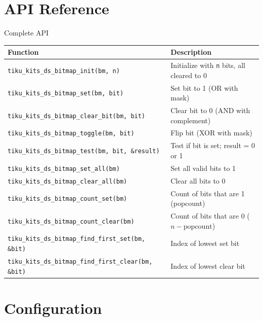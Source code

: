 \documentclass[aspectratio=169, 10pt]{beamer}
\begin{document}
\section{API Reference}

\begin{frame}[fragile]{Complete API}
\begin{table}
\centering
\small
\begin{tabular}{@{}lp{7.5cm}@{}}
\toprule
\textbf{Function} & \textbf{Description} \\
\midrule
\texttt{tiku\_kits\_ds\_bitmap\_init(bm, n)}
  & Initialize with \texttt{n} bits, all cleared to 0 \\
\midrule
\texttt{tiku\_kits\_ds\_bitmap\_set(bm, bit)}
  & Set bit to 1 (OR with mask) \\
\texttt{tiku\_kits\_ds\_bitmap\_clear\_bit(bm, bit)}
  & Clear bit to 0 (AND with complement) \\
\texttt{tiku\_kits\_ds\_bitmap\_toggle(bm, bit)}
  & Flip bit (XOR with mask) \\
\texttt{tiku\_kits\_ds\_bitmap\_test(bm, bit, \&result)}
  & Test if bit is set; result = 0 or 1 \\
\midrule
\texttt{tiku\_kits\_ds\_bitmap\_set\_all(bm)}
  & Set all valid bits to 1 \\
\texttt{tiku\_kits\_ds\_bitmap\_clear\_all(bm)}
  & Clear all bits to 0 \\
\midrule
\texttt{tiku\_kits\_ds\_bitmap\_count\_set(bm)}
  & Count of bits that are 1 (popcount) \\
\texttt{tiku\_kits\_ds\_bitmap\_count\_clear(bm)}
  & Count of bits that are 0 ($n - \text{popcount}$) \\
\midrule
\texttt{tiku\_kits\_ds\_bitmap\_find\_first\_set(bm, \&bit)}
  & Index of lowest set bit \\
\texttt{tiku\_kits\_ds\_bitmap\_find\_first\_clear(bm, \&bit)}
  & Index of lowest clear bit \\
\bottomrule
\end{tabular}
\end{table}
\end{frame}

\section{Configuration}
\end{document}
